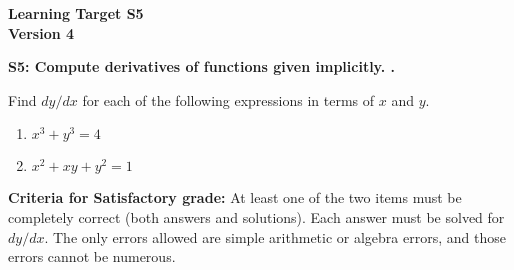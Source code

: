 \documentclass[10pt]{article}
\begin{document}
	\vspace*{0in}

		\begin{center}
			\textbf{Learning Target S5 \\
			Version 4} 
		\end{center}


\begin{framed}
	\textbf{S5: Compute derivatives of functions given implicitly.
.}
\end{framed}

Find $dy/dx$ for each of the following expressions in terms of $x$ and $y$. 

\begin{enumerate}
    \item $x^3 + y^3= 4$
    \item $x^2 + xy + y^2 = 1$
\end{enumerate}

\vfill


\begin{small}
    \begin{framed}
        	\textbf{Criteria for Satisfactory grade:} At least one of the two items must be completely correct (both answers and solutions). Each answer must be solved for $dy/dx$. The only errors allowed are simple arithmetic or algebra errors, and those errors cannot be numerous.
    \end{framed}

\end{small}
\end{document}
